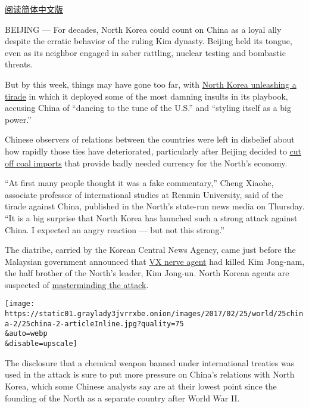 \href{http://cn.nytimes3xbfgragh.onion/asia-pacific/20170227/china-north-korea-relations-kim-jong-un/}{阅读简体中文版}

BEIJING --- For decades, North Korea could count on China as a loyal
ally despite the erratic behavior of the ruling Kim dynasty. Beijing
held its tongue, even as its neighbor engaged in saber rattling, nuclear
testing and bombastic threats.

But by this week, things may have gone too far, with
\href{https://www.nytimes3xbfgragh.onion/2017/02/23/world/asia/north-korea-china.html}{North
Korea unleashing a tirade} in which it deployed some of the most damning
insults in its playbook, accusing China of ``dancing to the tune of the
U.S.'' and ``styling itself as a big power.''

Chinese observers of relations between the countries were left in
disbelief about how rapidly those ties have deteriorated, particularly
after Beijing decided to
\href{https://www.nytimes3xbfgragh.onion/2017/02/18/world/asia/north-korea-china-coal-imports-suspended.html}{cut
off coal imports} that provide badly needed currency for the North's
economy.

``At first many people thought it was a fake commentary,'' Cheng Xiaohe,
associate professor of international studies at Renmin University, said
of the tirade against China, published in the North's state-run news
media on Thursday. ``It is a big surprise that North Korea has launched
such a strong attack against China. I expected an angry reaction --- but
not this strong.''

The diatribe, carried by the Korean Central News Agency, came just
before the Malaysian government announced that
\href{https://www.nytimes3xbfgragh.onion/2017/02/24/world/asia/vx-nerve-agent-kim-jong-nam.html}{VX
nerve agent} had killed Kim Jong-nam, the half brother of the North's
leader, Kim Jong-un. North Korean agents are suspected of
\href{https://www.nytimes3xbfgragh.onion/2017/02/22/world/asia/kim-jong-nam-assassination-korea-malaysia.html}{masterminding
the attack}.

\texttt{[image: https://static01.graylady3jvrrxbe.onion/images/2017/02/25/world/25china-2/25china-2-articleInline.jpg?quality=75\\\&auto=webp\\\&disable=upscale]}

The disclosure that a chemical weapon banned under international
treaties was used in the attack is sure to put more pressure on China's
relations with North Korea, which some Chinese analysts say are at their
lowest point since the founding of the North as a separate country after
World War II.

